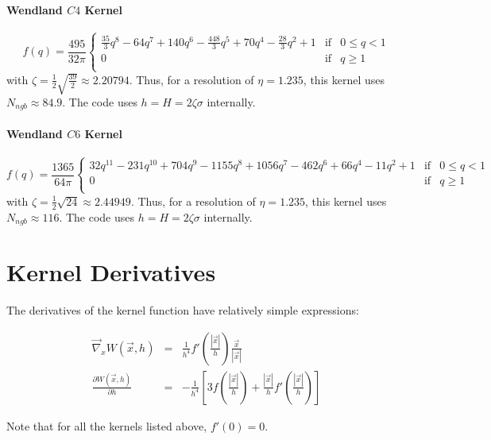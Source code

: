 \documentclass[a4paper,10pt]{article}
\begin{document}
\paragraph{Wendland $C4$ Kernel}
\begin{equation*}
 f(q) = \frac{495}{32\pi}\left\lbrace \begin{array}{rcl}
                      \frac{35}{3} q^8-64 q^7+ 140 q^6-\frac{448}{3} q^5+70 q^4-\frac{28}{3} q^2+1 & \mbox{if} & 0 
\leq q < 1 \\
		      0 & \mbox{if} & q \geq 1 \\
                     \end{array}\right.
\end{equation*}
 with $\zeta = \frac{1}{2}\sqrt{\frac{39}{2}} \approx 2.20794$. Thus, for a resolution of $\eta = 1.235$, this kernel 
uses $N_{ngb} \approx 84.9$. The code uses $h = H = 2\zeta \sigma$ internally.

\paragraph{Wendland $C6$ Kernel}
\begin{equation*}
 f(q) = \frac{1365}{64\pi}\left\lbrace \begin{array}{rcl}
                      32 q^{11}-231 q^{10}+704 q^9-1155 q^8+1056 q^7-462 q^6+66 q^4-11 q^2+1 & \mbox{if} & 0 
\leq q < 1 \\
		      0 & \mbox{if} & q \geq 1 \\
                     \end{array}\right.
\end{equation*}
 with $\zeta = \frac{1}{2}\sqrt{24} \approx 2.44949$. Thus, for a resolution of $\eta = 1.235$, this kernel 
uses $N_{ngb} \approx 116$. The code uses $h = H = 2\zeta \sigma$ internally.

\section{Kernel Derivatives}

The derivatives of the kernel function have relatively simple expressions:

\begin{eqnarray*}
 \vec\nabla_x W(\vec{x},h) &=& \frac{1}{h^4}f'\left(\frac{|\vec{x}|}{h}\right) \frac{\vec{x}}{|\vec{x}|} \\
 \frac{\partial W(\vec{x},h)}{\partial h} &=&- \frac{1}{h^4}\left[3f\left(\frac{|\vec{x}|}{h}\right) + 
\frac{|\vec{x}|}{h}f'\left(\frac{|\vec{x}|}{h}\right)\right]
\end{eqnarray*}

Note that for all the kernels listed above, $f'(0) = 0$. 
\end{document}
